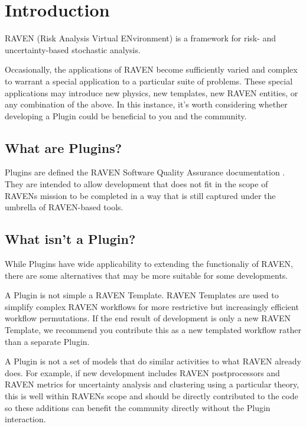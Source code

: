 \section{Introduction}

RAVEN (Risk Analysis Virtual ENvironment) \cite{raven, RAVENuserManual} is a framework for risk- and
uncertainty-based stochastic analysis. %

Occasionally, the applications of RAVEN become sufficiently varied and complex to warrant a special application to a particular suite of problems. These special applications may introduce new physics, new templates, new RAVEN entities, or any combination of the above. In this instance, it's worth considering whether developing a Plugin could be beneficial to you and the community.

\subsection{What are Plugins?}

Plugins are defined the RAVEN Software Quality Assurance documentation \cite{RAVENuserManual}. They are intended to allow development that does not fit in the scope of RAVENs mission to be completed in a way that is still captured under the umbrella of RAVEN-based tools.

\subsection{What isn't a Plugin?}

While Plugins have wide applicability to extending the functionaliy of RAVEN, there are some alternatives that may be more suitable for some developments.

A Plugin is not simple a RAVEN Template. RAVEN Templates are used to simplify complex RAVEN workflows for more restrictive but increasingly efficient workflow permutations. If the end result of development is only a new RAVEN Template, we recommend you contribute this as a new templated workflow rather than a separate Plugin.

A Plugin is not a set of models that do similar activities to what RAVEN already does. For example, if new development includes RAVEN postprocessors and RAVEN metrics for uncertainty analysis and clustering using a particular theory, this is well within RAVENs scope and should be directly contributed to the code so these additions can benefit the community directly without the Plugin interaction.


